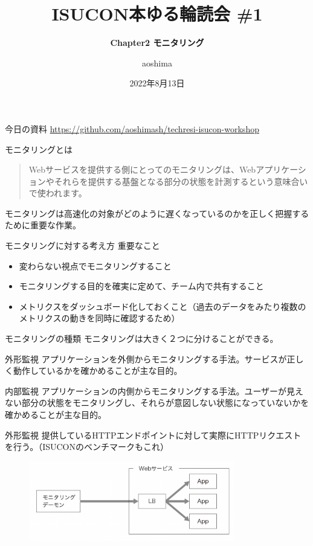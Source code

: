 \documentclass{beamer}
\title{\bfseries ISUCON本ゆる輪読会 \#1}
\subtitle{\bfseries Chapter2 モニタリング}
\author{aoshima}
\date{2022年8月13日}
\begin{document}
\begin{frame}
  \titlepage
\end{frame}

\begin{frame}{今日の資料}
  \href{https://github.com/aoshimash/techresi-isucon-workshop}{https://github.com/aoshimash/techresi-isucon-workshop}
\end{frame}

\begin{frame}{モニタリングとは}
  \begin{quote}
    Webサービスを提供する側にとってのモニタリングは、Webアプリケーションやそれらを提供する基盤となる部分の状態を計測するという意味合いで使われます。
  \end{quote}
  モニタリングは高速化の対象がどのように遅くなっているのかを正しく把握するために重要な作業。
\end{frame}

\begin{frame}{モニタリングに対する考え方}
  重要なこと
  \begin{itemize}
    \item 変わらない視点でモニタリングすること
    \item モニタリングする目的を確実に定めて、チーム内で共有すること
    \item メトリクスをダッシュボード化しておくこと（過去のデータをみたり複数のメトリクスの動きを同時に確認するため）
  \end{itemize}
\end{frame}

\begin{frame}{モニタリングの種類}
  モニタリングは大きく２つに分けることができる。
  \begin{block}{外形監視}
    アプリケーションを外側からモニタリングする手法。サービスが正しく動作しているかを確かめることが主な目的。
  \end{block}
  \begin{block}{内部監視}
    アプリケーションの内側からモニタリングする手法。ユーザーが見えない部分の状態をモニタリングし、それらが意図しない状態になっていないかを確かめることが主な目的。
  \end{block}
\end{frame}

\begin{frame}{外形監視}
  提供しているHTTPエンドポイントに対して実際にHTTPリクエストを行う。（ISUCONのベンチマークもこれ）
  \begin{figure}
    \centering
    \includegraphics[clip, keepaspectratio, width=90mm]{./fig/external_monitoring.png}
  \end{figure}
\end{frame}
\end{document}

